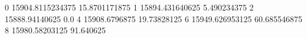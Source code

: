 0 15904.8115234375 15.8701171875
1 15894.431640625 5.490234375
2 15888.94140625 0.0
4 15908.6796875 19.73828125
6 15949.626953125 60.685546875
8 15980.58203125 91.640625
